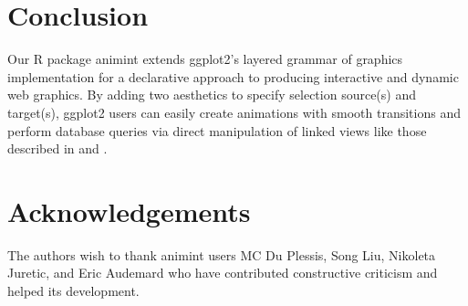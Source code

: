 \documentclass[journal]{vgtc}\usepackage[]{graphicx}\usepackage[]{color}
\begin{document}
\section{Conclusion}

Our R package animint extends ggplot2's layered grammar of graphics 
implementation for a declarative approach to producing interactive
and dynamic web graphics. By adding two aesthetics to specify selection
source(s) and target(s), ggplot2 users can easily create animations with 
smooth transitions and perform database queries via direct manipulation of 
linked views like those described in \citep{Ahlberg:1991} and 
\citep{Buja:1991vh}.

\section*{Acknowledgements}

The authors wish to thank animint users MC Du Plessis, Song Liu,
Nikoleta Juretic, and Eric Audemard
who have contributed constructive criticism and helped its development.

%



\end{document}
